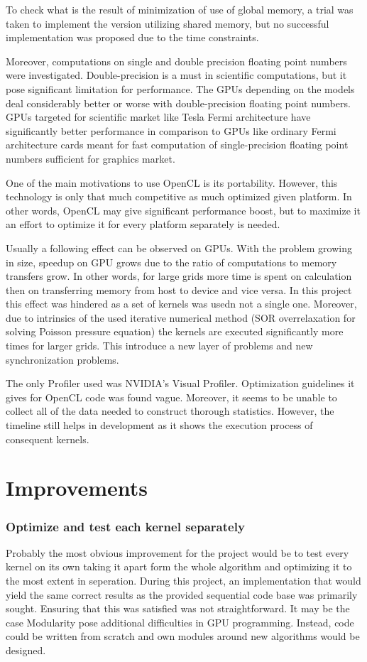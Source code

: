 To check what is the result of minimization of use of global memory, a trial was taken to implement the version utilizing shared memory, but no successful implementation was proposed due to the time constraints.

Moreover, computations on single and double precision floating point numbers were investigated. Double-precision is a must in scientific computations, but it pose significant limitation for performance. The GPUs depending on the models deal considerably better or worse with double-precision floating point numbers. GPUs targeted for scientific market like Tesla Fermi architecture have significantly better performance in comparison to GPUs like ordinary Fermi architecture cards meant for fast computation of single-precision floating point numbers sufficient for graphics market. 

One of the main motivations to use OpenCL is its portability. However, this technology is only that much competitive as much optimized given platform. In other words, OpenCL may give significant performance boost, but to maximize it an effort to optimize it for every platform separately is needed.

Usually a following effect can be observed on GPUs. With the problem growing in size, speedup on GPU grows due to the ratio of computations to memory transfers grow. In other words, for large grids more time is spent on calculation then on transferring memory from host to device and vice versa. In this project this effect was hindered as a set of kernels was usedn not a single one. Moreover, due to intrinsics of the used iterative numerical method (SOR overrelaxation for solving Poisson pressure equation) the kernels are executed significantly more times for larger grids.  This introduce a new layer of problems and new synchronization problems.

The only Profiler used was NVIDIA's Visual Profiler. Optimization guidelines it gives for OpenCL code was found vague. Moreover, it seems to be unable to collect all of the data needed to construct thorough statistics. However, the timeline still helps in development as it shows the execution process of consequent kernels.

\section{Improvements}
\subsubsection{Optimize and test each kernel separately}
Probably the most obvious improvement for the project would be to test every kernel on its own taking it apart form the whole algorithm and optimizing it to the most extent in seperation. During this project, an implementation that would yield the same correct results as the provided sequential code base was primarily sought. Ensuring that this was satisfied was not straightforward. It may be the case Modularity pose additional difficulties in GPU programming. Instead, code could be written from scratch and own modules around new algorithms would be designed.


